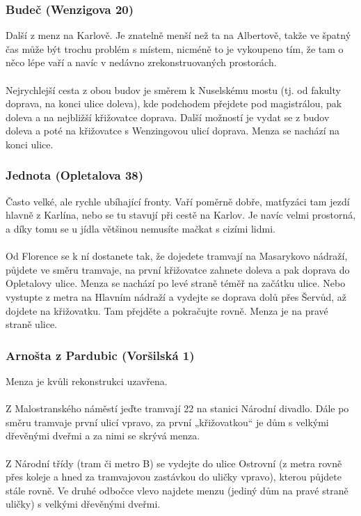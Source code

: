 \subsubsection{Budeč (Wenzigova 20)}
Další z menz na Karlově. Je znatelně menší než ta na Albertově, takže ve špatný
čas může být trochu problém s místem, nicméně to je vykoupeno tím, že tam o něco
lépe vaří a navíc v nedávno zrekonstruovaných prostorách.
\\\\
Nejrychlejší cesta z obou budov je směrem k Nuselskému mostu (tj. od fakulty
doprava, na konci ulice doleva), kde podchodem přejdete pod magistrálou, pak
doleva a na nejbližší křižovatce doprava. Další možností je vydat se z budov
doleva a poté na křižovatce s Wenzingovou ulicí doprava. Menza se nachází na
konci ulice.


\subsubsection{Jednota (Opletalova 38)}
Často velké, ale rychle ubíhající fronty. Vaří poměrně dobře, matfyzáci tam
jezdí hlavně z Karlína, nebo se tu stavují při cestě na Karlov. Je navíc velmi
prostorná, a díky tomu se u jídla většinou nemusíte mačkat s cizími lidmi.
\\\\
Od Florence se k ní dostanete tak, že dojedete tramvají na Masarykovo nádraží,
půjdete ve směru tramvaje, na první křižovatce zahnete doleva a pak doprava do
Opletalovy ulice. Menza se nachází po levé straně téměř na začátku ulice. Nebo
vystupte z metra na Hlavním nádraží a vydejte se doprava dolů přes Šervůd, až
dojdete na křižovatku. Tam přejděte a pokračujte rovně. Menza je na pravé straně
ulice.


\subsubsection{Arnošta z Pardubic (Voršilská 1)}
Menza je kvůli rekonstrukci uzavřena.
\\\\
Z Malostranského náměstí jeďte tramvají 22 na stanici Národní divadlo. Dále po
směru tramvaje první ulicí vpravo, za první „křižovatkou“ je dům s velkými
dřevěnými dveřmi a za nimi se skrývá menza.
\\\\
Z Národní třídy (tram či metro B) se vydejte do ulice Ostrovní (z metra rovně
přes koleje a hned za tramvajovou zastávkou do uličky vpravo), kterou půjdete
stále rovně. Ve druhé odbočce vlevo najdete menzu (jediný dům na pravé straně
uličky) s velkými dřevěnými dveřmi.


